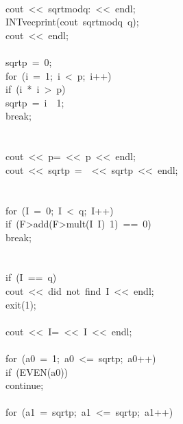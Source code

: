 \begin{tabbing}
\>\>\\[0pt]
\>cout\ <<\ sqrtmodq:\ <<\ endl;\\[0pt]
\>INTvecprint(cout\ sqrtmodq\ q);\\[0pt]
\>cout\ <<\ endl;\\[0pt]
\\[0pt]
\>sqrtp\ =\ 0;\\[0pt]
\>for\ (i\ =\ 1;\ i\ <\ p;\ i++)\ \\[0pt]
\>\>if\ (i\ *\ i\ >\ p)\ \\[0pt]
\>\>\>sqrtp\ =\ i\ \ 1;\\[0pt]
\>\>\>break;\\[0pt]
\>\>\>\\[0pt]
\>\>\\[0pt]
\>cout\ <<\ p=\ <<\ p\ <<\ endl;\\[0pt]
\>cout\ <<\ sqrtp\ =\ \ <<\ sqrtp\ <<\ endl;\\[0pt]
\\[0pt]
\>\\[0pt]
\>for\ (I\ =\ 0;\ I\ <\ q;\ I++)\ \\[0pt]
\>\>if\ (F>add(F>mult(I\ I)\ 1)\ ==\ 0)\ \\[0pt]
\>\>\>break;\\[0pt]
\>\>\>\\[0pt]
\>\>\\[0pt]
\>if\ (I\ ==\ q)\ \\[0pt]
\>\>cout\ <<\ did\ not\ find\ I\ <<\ endl;\\[0pt]
\>\>exit(1);\\[0pt]
\>\>\\[0pt]
\>cout\ <<\ I=\ <<\ I\ <<\ endl;\\[0pt]
\>\\[0pt]
\>for\ (a0\ =\ 1;\ a0\ <=\ sqrtp;\ a0++)\ \\[0pt]
\>\>if\ (EVEN(a0))\ \\[0pt]
\>\>\>continue;\\[0pt]
\>\>\>\\[0pt]
\>\>for\ (a1\ =\ sqrtp;\ a1\ <=\ sqrtp;\ a1++)\ \\[0pt]

\end{tabbing}
